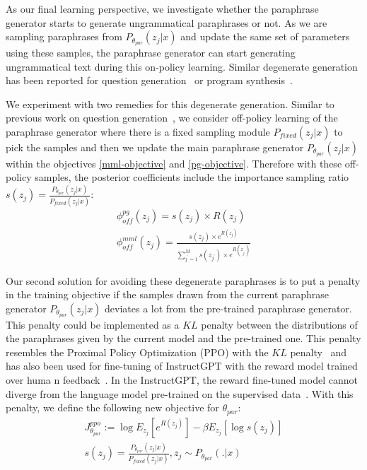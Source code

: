 \documentclass[11pt]{article}
\begin{document}
As our final learning perspective, we investigate whether the paraphrase generator starts to generate ungrammatical paraphrases or not. As we are sampling paraphrases from $P_{\theta_{par}}(z_{j}|x)$ and update the same set of parameters using these samples, the paraphrase generator can start generating ungrammatical text during this on-policy learning. Similar degenerate generation has been reported for question generation~\cite{najafi-fyshe-2023-weakly} or program synthesis~\cite{NEURIPS2018_f4e369c0}.

We experiment with two remedies for this degenerate generation. Similar to previous work on question generation~\cite{najafi-fyshe-2023-weakly}, we consider off-policy learning of the paraphrase generator where there is a fixed sampling module $P_{fixed}(z_{j}|x)$ to pick the samples and then we update the main paraphrase generator $P_{\theta_{par}}(z_{j}|x)$ within the objectives \ref{mml-objective} and \ref{pg-objective}. Therefore with these off-policy samples, the posterior coefficients include the importance sampling ratio $s(z_{j}) = \frac{P_{\theta_{par}}(z_{j}|x)}{P_{fixed}(z_{j}|x)}$:
\begin{multline}
\phi^{pg}_{off}(z_{j}) = s(z_{j}) \times R(z_{j})\\
\phi^{mml}_{off}(z_{j}) = \frac{s(z_{j}) \times e^{R(z_{j})}}{\sum^{M}_{j^{'}=1} s(z_{j^{'}}) \times e^{R(z_{j^{'}})}}
\label{off-pg-mml-objective}
\end{multline}

Our second solution for avoiding these degenerate paraphrases is to put a penalty in the training objective if the samples drawn from the current paraphrase generator $P_{\theta_{par}}(z_{j}|x)$ deviates a lot from the pre-trained paraphrase generator. This penalty could be implemented as a $KL$ penalty between the distributions of the paraphrases given by the current model and the pre-trained one. This penalty resembles the Proximal Policy Optimization (PPO) with the $KL$ penalty~\cite{DBLP:journals/corr/SchulmanWDRK17} and has also been used for fine-tuning of InstructGPT with the reward model trained over huma n feedback~\cite{ouyang2022training}. In the InstructGPT, the reward fine-tuned model cannot diverge from the language model pre-trained on the supervised data~\cite{ouyang2022training}. With this penalty, we define the following new objective for $\theta_{par}$:
\begin{multline}
J^{ppo}_{\theta_{par}} 
:= \log E_{z_{j}} [e^{R(z_{j})}] - \beta E_{z_{j}} [\log s(z_j)] \\
s(z_{j}) = \frac{P_{\theta_{par}}(z_{j}|x)}{P_{fixed}
(z_{j}|x)}, z_{j} \sim P_{\theta_{par}}(.|x)
\label{lmfp-expect-ppo-objective}
\end{multline}
\end{document}
